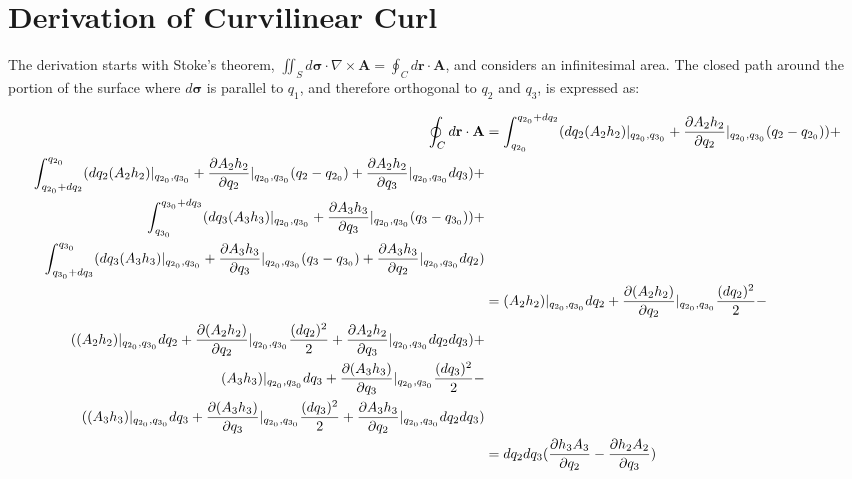 \documentclass{article}
\begin{document}
\begin{figure}
\caption{}
\label{fig:axes}
\end{figure}

\section*{Derivation of Curvilinear Curl}
\label{sec:curl}

The derivation starts with Stoke's theorem, $ \iint_S d {\bm \sigma} \cdot \nabla \times \textbf{A} = \oint_C d\textbf{r} \cdot \textbf{A}$, and considers an infinitesimal area. The closed path around the portion of the surface where $ d {\bm \sigma} $ is parallel to $q_1$, and therefore orthogonal to $q_2$ and $q_3$, is expressed as:

\begin{equation}
\begin{split}
\oint_C d\textbf{r} \cdot \textbf{A} &= \int_{q_{2_0}}^{q_{2_0}+dq_2} (dq_2 (A_2 h_2) |_{q_{2_0}, q_{3_0}} + \frac{\partial{A_2 h_2}}{\partial{q_2}} |_{q_{2_0},q_{3_0}} (q_2 - q_{2_0})) + \\
\int_{q_{2_0} + dq_2}^{q_{2_0}} (dq_2 (A_2 h_2) |_{q_{2_0}, q_{3_0}} + \frac{\partial{A_2 h_2}}{\partial{q_2}} |_{q_{2_0},q_{3_0}} (q_2 - q_{2_0}) + \frac{\partial{A_2 h_2}}{\partial{q_3}} |_{q_{2_0},q_{3_0}} dq_3) + \\
\int_{q_{3_0}}^{q_{3_0} + dq_3} (dq_3 (A_3 h_3) |_{q_{2_0}, q_{3_0}} + \frac{\partial{A_3 h_3}}{\partial{q_3}} |_{q_{2_0},q_{3_0}} (q_3 - q_{3_0})) + \\
 \int_{q_{3_0} + dq_3}^{q_{3_0}} (dq_3 (A_3 h_3) |_{q_{2_0}, q_{3_0}} + \frac{\partial{A_3 h_3}}{\partial{q_3}} |_{q_{2_0},q_{3_0}} (q_3 - q_{3_0}) + \frac{\partial{A_3 h_3}}{\partial{q_2}} |_{q_{2_0},q_{3_0}} dq_2) \\
&= (A_2 h_2) |_{q_{2_0}, q_{3_0}} dq_2 + \frac{\partial{(A_2 h_2)}}{\partial{q_2}} |_{q_{2_0}, q_{3_0}} \frac{(dq_2)^2}{2} - \\
((A_2 h_2) |_{q_{2_0}, q_{3_0}} dq_2 + \frac{\partial{(A_2 h_2)}}{\partial{q_2}} |_{q_{2_0}, q_{3_0}} \frac{(dq_2)^2}{2} + \frac{\partial{A_2 h_2}}{\partial{q_3}} |_{q_{2_0},q_{3_0}} dq_2 dq_3) + \\
(A_3 h_3) |_{q_{2_0}, q_{3_0}} dq_3 + \frac{\partial{(A_3 h_3)}}{\partial{q_3}} |_{q_{2_0}, q_{3_0}} \frac{(dq_3)^2}{2} - \\
((A_3 h_3) |_{q_{2_0}, q_{3_0}} dq_3 + \frac{\partial{(A_3 h_3)}}{\partial{q_3}} |_{q_{2_0}, q_{3_0}} \frac{(dq_3)^2}{2} + \frac{\partial{A_3 h_3}}{\partial{q_2}} |_{q_{2_0},q_{3_0}} dq_2 dq_3) \\
&=  dq_2 dq_3 (\frac{\partial{h_3 A_3}}{\partial{q_2}} - \frac{\partial{h_2 A_2}}{\partial{q_3}}) \\
\end{split}
\end{equation}
\end{document}
